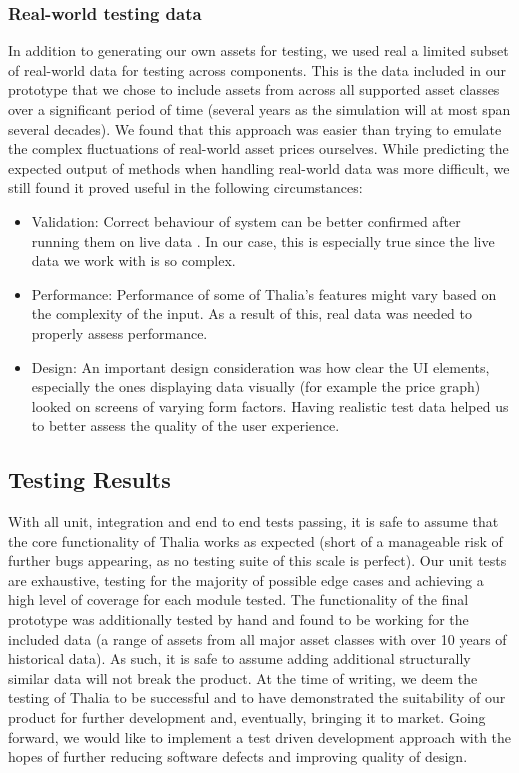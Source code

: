 \documentclass[main.tex]{subfiles}
\begin{document}
\subsubsection{Real-world testing data}

In addition to generating our own assets for testing, we used real a limited subset of real-world data for testing across components. This is the data included in our prototype that we chose to include assets from across all supported asset classes over a significant period of time (several years as the simulation will at most span several decades). We found that this approach was easier than trying to emulate the complex fluctuations of real-world asset prices ourselves. While predicting the expected output of methods when handling real-world data was more difficult, we still found it proved useful in the following circumstances: 

\begin{itemize}

\item Validation:
Correct behaviour of system can be better confirmed after running them on live data \cite{liveData}. In our case, this is especially true since the live data we work with is so complex.

\item Performance:
Performance of some of Thalia's features might vary based on the complexity of the input. As a result of this, real data was needed to properly assess performance.

\item Design:
An important design consideration was how clear the UI elements, especially the ones displaying data visually (for example the price graph) looked on screens of varying form factors. Having realistic test data helped us to better assess the quality of the user experience.

\end{itemize}
 

\subsection{Testing Results}

With all unit, integration and end to end tests passing, it is safe to assume that the core functionality of Thalia works as expected (short of a manageable risk of further bugs appearing, as no testing suite of this scale is perfect). Our unit tests are exhaustive, testing for the majority of possible edge cases and achieving a high level of coverage for each module tested. The functionality of the final prototype was additionally tested by hand and found to be working for the included data (a range of assets from all major asset classes with over 10 years of historical data). As such, it is safe to assume adding additional structurally similar data will not break the product.
At the time of writing, we deem the testing of Thalia to be successful and to have demonstrated the suitability of our product for further development and, eventually, bringing it to market. Going forward, we would like to implement a test driven development approach with the hopes of further reducing software defects and  improving quality of design\cite{TDD}.
\end{document}
